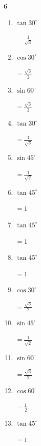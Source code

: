 \begin{multicols}{6}
\begin{enumerate}
  \item $\displaystyle \tan{30^\circ}$

        $\displaystyle =\frac{1}{\sqrt{3}}$

  \item $\displaystyle \cos{30^\circ}$

        $\displaystyle =\frac{\sqrt{3}}{2}$

\columnbreak %

  \item $\displaystyle \sin{60^\circ}$

        $\displaystyle =\frac{\sqrt{3}}{2}$

  \item $\displaystyle \tan{30^\circ}$

        $\displaystyle =\frac{1}{\sqrt{3}}$

  \item $\displaystyle \sin{45^\circ}$

        $\displaystyle =\frac{1}{\sqrt{2}}$

  \item $\displaystyle \tan{45^\circ}$

        $\displaystyle =1$

  \item $\displaystyle \tan{45^\circ}$

        $\displaystyle =1$

  \item $\displaystyle \tan{45^\circ}$

        $\displaystyle =1$

  \item $\displaystyle \cos{30^\circ}$

        $\displaystyle =\frac{\sqrt{3}}{2}$

  \item $\displaystyle \sin{45^\circ}$

        $\displaystyle =\frac{1}{\sqrt{2}}$

  \item $\displaystyle \sin{60^\circ}$

        $\displaystyle =\frac{\sqrt{3}}{2}$

  \item $\displaystyle \cos{60^\circ}$

        $\displaystyle =\frac{1}{2}$

  \item $\displaystyle \tan{45^\circ}$

        $\displaystyle =1$


\end{enumerate}
\end{multicols}
